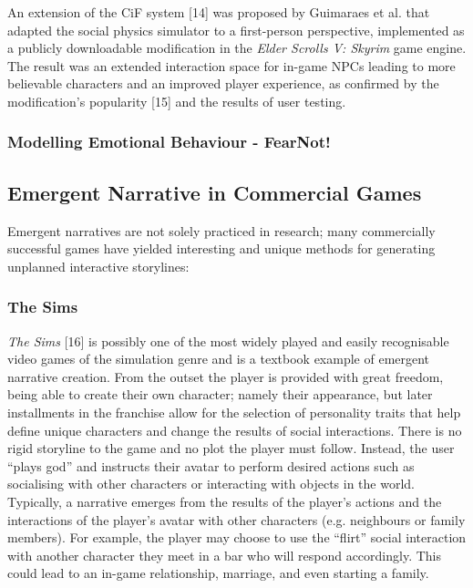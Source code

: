 \documentclass{sig-alternate-05-2015}
\begin{document}
\newline An extension of the CiF system [14] was proposed by Guimaraes et al. that adapted the social physics simulator to a first-person perspective, implemented as a publicly downloadable modification in the \textit{Elder Scrolls V: Skyrim} game engine. The result was an extended interaction space for in-game NPCs leading to more believable characters and an improved player experience, as confirmed by the modification's popularity [15] and the results of user testing.

\subsubsection{Modelling Emotional Behaviour - FearNot!}

\subsection{Emergent Narrative in Commercial Games}
Emergent narratives are not solely practiced in research; many commercially successful games have yielded interesting and unique methods for generating unplanned interactive storylines:

\subsubsection{The Sims}
\textit{The Sims} [16] is possibly one of the most widely played and easily recognisable video games of the simulation genre and is a textbook example of emergent narrative creation. 
From the outset the player is provided with great freedom, being able to create their own character; namely their appearance, but later installments in the franchise allow for the selection of personality traits that help define unique characters and change the results of social interactions. There is no rigid storyline to the game and no plot the player must follow. Instead, the user ``plays god'' and instructs their avatar to perform desired actions such as socialising with other characters or interacting with objects in the world. Typically, a narrative emerges from the results of the player's actions and the interactions of the player's avatar with other characters (e.g. neighbours or family members). For example, the player may choose to use the ``flirt'' social interaction with another character they meet in a bar who will respond accordingly. This could lead to an in-game relationship, marriage, and even starting a family.
\end{document}
